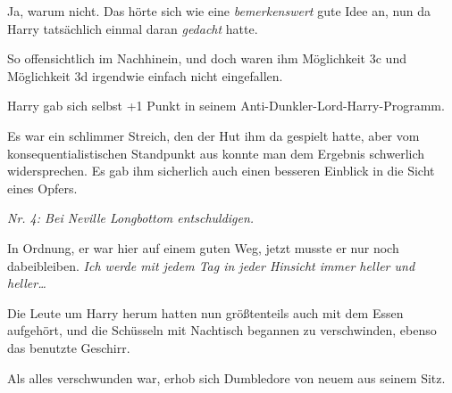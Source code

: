 Ja, warum nicht. Das hörte sich wie eine \emph{bemerkenswert} gute Idee an, nun da Harry tatsächlich einmal daran \emph{gedacht} hatte.

So offensichtlich im Nachhinein, und doch waren ihm Möglichkeit 3c und Möglichkeit 3d irgendwie einfach nicht eingefallen.

Harry gab sich selbst +1 Punkt in seinem Anti-Dunkler-Lord-Harry-Programm.

Es war ein schlimmer Streich, den der Hut ihm da gespielt hatte, aber vom konsequentialistischen Standpunkt aus konnte man dem Ergebnis schwerlich widersprechen. Es gab ihm sicherlich auch einen besseren Einblick in die Sicht eines Opfers.

\emph{Nr. 4: Bei Neville Longbottom entschuldigen.}

In Ordnung, er war hier auf einem guten Weg, jetzt musste er nur noch dabeibleiben. \emph{Ich werde mit jedem Tag in jeder Hinsicht immer heller und heller…}%

Die Leute um Harry herum hatten nun größtenteils auch mit dem Essen aufgehört, und die Schüsseln mit Nachtisch begannen zu verschwinden, ebenso das benutzte Geschirr.

Als alles verschwunden war, erhob sich Dumbledore von neuem aus seinem Sitz.

